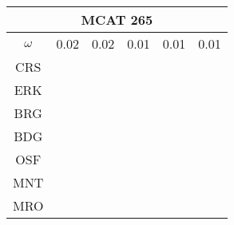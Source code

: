 \documentclass[a4paper,12pt]{article}
\begin{document}
\begin{tabular}{|c|c|c|c|c|c|}%
         \hline \multicolumn{6}{|c|}{MCAT 265} \\ \hline
         $\omega$&0.02&0.02&0.01&0.01&0.01 \\ \hline %
        CRS&\cellcolor[HTML]{E41A1C}&\cellcolor[HTML]{E41A1C}&\cellcolor[HTML]{E41A1C}&\cellcolor[HTML]{E41A1C}&\cellcolor[HTML]{E41A1C}\\ \hline %
        ERK&\cellcolor[HTML]{E41A1C}&\cellcolor[HTML]{E41A1C}&\cellcolor[HTML]{377EB8}&\cellcolor[HTML]{E41A1C}&\cellcolor[HTML]{E41A1C}\\ \hline %
        BRG&\cellcolor[HTML]{377EB8}&\cellcolor[HTML]{377EB8}&\cellcolor[HTML]{377EB8}&\cellcolor[HTML]{E41A1C}&\cellcolor[HTML]{E41A1C}\\ \hline %
        BDG&\cellcolor[HTML]{377EB8}&\cellcolor[HTML]{377EB8}&\cellcolor[HTML]{377EB8}&\cellcolor[HTML]{377EB8}&\cellcolor[HTML]{377EB8}\\ \hline %
        OSF&\cellcolor[HTML]{377EB8}&\cellcolor[HTML]{377EB8}&\cellcolor[HTML]{4DAF4A}&\cellcolor[HTML]{4DAF4A}&\cellcolor[HTML]{377EB8}\\ \hline %
        MNT&\cellcolor[HTML]{4DAF4A}&\cellcolor[HTML]{4DAF4A}&\cellcolor[HTML]{984EA3}&\cellcolor[HTML]{984EA3}&\cellcolor[HTML]{4DAF4A}\\ \hline %
        MRO&\cellcolor[HTML]{4DAF4A}&\cellcolor[HTML]{4DAF4A}&\cellcolor[HTML]{FF7F00}&\cellcolor[HTML]{FF7F00}&\cellcolor[HTML]{4DAF4A}\\ \hline %

\end{tabular}
\end{document}
